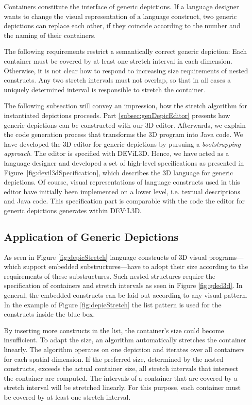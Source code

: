 \documentclass[a4paper]{article}
\newcommand{\dev}{DEViL3D\xspace}
\begin{document}
Containers constitute the interface of generic depictions. If a language designer wants to change the visual representation of a language construct, two generic depictions can replace each other, if they coincide according to the number and the naming of their containers.

The following requirements restrict a semantically correct generic depiction: Each container must be covered by at least one stretch interval in each dimension. Otherwise, it is not clear how to respond to increasing size requirements of nested constructs. Any two stretch intervals must not overlap, so that in all cases a uniquely determined interval is responsible to stretch the container.

The following subsection will convey an impression, how the stretch algorithm for instantiated depictions proceeds. Part \ref{subsec:genDepicEditor} presents how generic depictions can be constructed with our 3D editor. Afterwards, we explain the code generation process that transforms the 3D program into Java code. We have developed the 3D editor for generic depictions by pursuing a \emph{bootstrapping approach}. The editor is specified with \dev. Hence, we have acted as a language designer and developed a set of high-level specifications as presented in Figure~\ref{fig:devil3dSpecification}, which describes the 3D language for generic depictions. Of course, visual representations of language constructs used in this editor have initially been implemented on a lower level, i.e. textual descriptions and Java code. This specification part is comparable with the code the editor for generic depictions generates within \dev.


\subsection{Application of Generic Depictions}
As seen in Figure \ref{fig:depicStretch} language constructs of 3D visual programs---which support embedded substructures---have to adopt their size according to the requirements of these substructures. Such nested structures require the specification of containers and stretch intervals as seen in Figure \ref{fig:gded3d}. In general, the embedded constructs can be laid out according to any visual pattern. In the example of Figure \ref{fig:depicStretch} the list pattern is used for the constructs inside the blue box.

By inserting more constructs in the list, the container's size could become insufficient. To adapt the size, an algorithm automatically stretches the container linearly. The algorithm operates on one depiction and iterates over all containers for each spatial dimension. If the preferred size, determined by the nested constructs, exceeds the actual container size, all stretch intervals that intersect the container are computed. The intervals of a container that are covered by a stretch interval will be stretched linearly. For this purpose, each container must be covered by at least one stretch interval.
\end{document}
